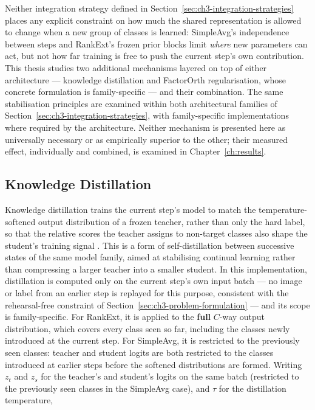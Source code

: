 Neither integration strategy defined in Section~\ref{sec:ch3-integration-strategies} places any explicit
constraint on how much the shared representation is allowed to change when
a new group of classes is learned: SimpleAvg's independence between steps
and RankExt's frozen prior blocks limit \emph{where} new parameters can act, but
not how far training is free to push the current step's own contribution.
This thesis studies two additional mechanisms layered on top of either
architecture --- knowledge distillation and FactorOrth regularisation,
whose concrete formulation is family-specific --- and their combination. The same stabilisation
principles are examined within both architectural families of
Section~\ref{sec:ch3-integration-strategies}, with family-specific
implementations where required by the architecture.
Neither mechanism is presented here as
universally necessary or as empirically superior to the other; their
measured effect, individually and combined, is examined in Chapter~\ref{ch:results}.

\subsection{Knowledge Distillation}
\label{sec:ch3-kd}

Knowledge distillation trains the current step's model to match the
temperature-softened output distribution of a frozen teacher, rather than
only the hard label, so that the relative scores the teacher assigns to
non-target classes also shape the student's training signal \parencite{hinton2015distilling}.
This is a form of self-distillation between successive states of the same
model family, aimed at stabilising continual learning rather than
compressing a larger teacher into a smaller student. In this
implementation, distillation is computed only on the current step's own
input batch --- no image or label from an earlier step is replayed for this
purpose, consistent with the rehearsal-free constraint of Section~\ref{sec:ch3-problem-formulation} ---
and its scope is family-specific. For RankExt, it is applied to the
\textbf{full} $C$-way output distribution, which covers every class seen
so far, including the classes newly introduced at the current step. For SimpleAvg, it is
restricted to the previously seen classes: teacher and student logits are
both restricted to the classes introduced at earlier steps before the
softened distributions are formed. Writing $z_t$ and $z_s$ for the
teacher's and student's logits on the same batch (restricted to the
previously seen classes in the SimpleAvg case), and $\tau$ for the
distillation temperature,

